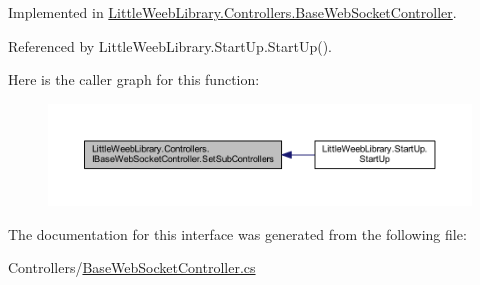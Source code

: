 Implemented in \mbox{\hyperlink{class_little_weeb_library_1_1_controllers_1_1_base_web_socket_controller_ae799e6c0e4c3ed0200b18a0360968ac8}{Little\+Weeb\+Library.\+Controllers.\+Base\+Web\+Socket\+Controller}}.



Referenced by Little\+Weeb\+Library.\+Start\+Up.\+Start\+Up().

Here is the caller graph for this function\+:\nopagebreak
\begin{figure}[H]
\begin{center}
\leavevmode
\includegraphics[width=350pt]{interface_little_weeb_library_1_1_controllers_1_1_i_base_web_socket_controller_a80d53e08202c06f729b0aa90d36c152f_icgraph}
\end{center}
\end{figure}


The documentation for this interface was generated from the following file\+:\begin{DoxyCompactItemize}
\item 
Controllers/\mbox{\hyperlink{_base_web_socket_controller_8cs}{Base\+Web\+Socket\+Controller.\+cs}}\end{DoxyCompactItemize}
